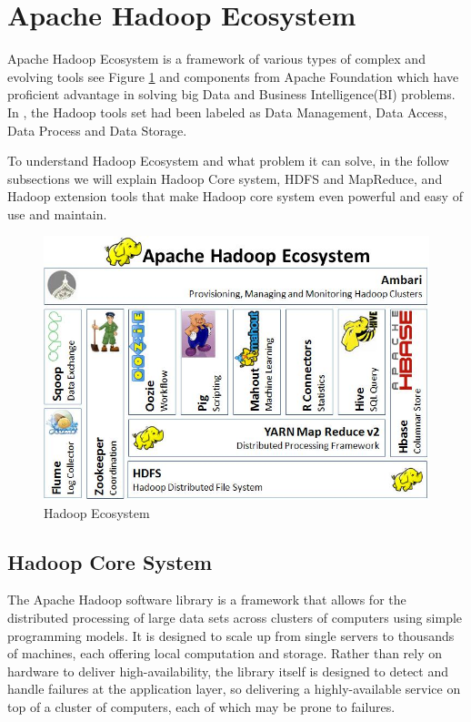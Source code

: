 \documentclass[11pt, oneside]{article}   	%
\begin{document}
\section{Apache Hadoop Ecosystem}
Apache Hadoop Ecosystem is a framework of various types of complex and evolving tools see Figure \ref{fig:hadoopecosystem}  and components from Apache Foundation which have proficient advantage in solving big Data and Business Intelligence(BI) problems. In , the Hadoop tools set had been labeled as Data Management, Data Access, Data Process and Data Storage.

To understand Hadoop Ecosystem and what problem it can solve, in the follow subsections we will explain Hadoop Core system, HDFS and MapReduce, and Hadoop extension tools that make Hadoop core system even powerful and easy of use and maintain. 

\begin{figure}
  \centering
  \includegraphics[width=\linewidth]{eco.jpg}
  \caption{Hadoop Ecosystem}
  \label{fig:hadoopecosystem}
\end{figure}

\subsection{Hadoop Core System}
The Apache Hadoop software library is a framework that allows for the distributed processing of large data sets across clusters of computers using simple programming models. It is designed to scale up from single servers to thousands of machines, each offering local computation and storage. Rather than rely on hardware to deliver high-availability, the library itself is designed to detect and handle failures at the application layer, so delivering a highly-available service on top of a cluster of computers, each of which may be prone to failures.
\end{document}
